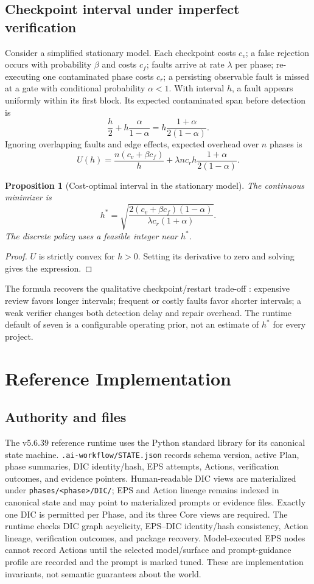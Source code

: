 \documentclass[11pt,a4paper]{article}
\newtheorem{proposition}[definition]{Proposition}
\begin{document}
\subsection{Checkpoint interval under imperfect verification}
Consider a simplified stationary model. Each checkpoint costs $c_v$; a false rejection occurs with probability $\beta$ and costs $c_f$; faults arrive at rate $\lambda$ per phase; re-executing one contaminated phase costs $c_r$; a persisting observable fault is missed at a gate with conditional probability $\alpha<1$. With interval $h$, a fault appears uniformly within its first block. Its expected contaminated span before detection is
\[
\frac h2+h\frac{\alpha}{1-\alpha}=h\frac{1+\alpha}{2(1-\alpha)}.
\]
Ignoring overlapping faults and edge effects, expected overhead over $n$ phases is
\[
U(h)=\frac{n(c_v+\beta c_f)}{h}+\lambda n c_r h\frac{1+\alpha}{2(1-\alpha)}.
\]
\begin{proposition}[Cost-optimal interval in the stationary model]
\label{prop:hstar}
The continuous minimizer is
\[
h^*=\sqrt{\frac{2(c_v+\beta c_f)(1-\alpha)}{\lambda c_r(1+\alpha)}}.
\]
The discrete policy uses a feasible integer near $h^*$.
\end{proposition}
\begin{proof}
$U$ is strictly convex for $h>0$. Setting its derivative to zero and solving gives the expression.
\end{proof}
The formula recovers the qualitative checkpoint/restart trade-off \cite{young1974first,daly2006higher}: expensive review favors longer intervals; frequent or costly faults favor shorter intervals; a weak verifier changes both detection delay and repair overhead. The runtime default of seven is a configurable operating prior, not an estimate of $h^*$ for every project.


\section{Reference Implementation}
\subsection{Authority and files}
The v5.6.39 reference runtime uses the Python standard library for its canonical state machine. \texttt{.ai-workflow/STATE.json} records schema version, active Plan, phase summaries, DIC identity/hash, EPS attempts, Actions, verification outcomes, and evidence pointers. Human-readable DIC views are materialized under \texttt{phases/<phase>/DIC/}; EPS and Action lineage remains indexed in canonical state and may point to materialized prompts or evidence files. Exactly one DIC is permitted per Phase, and its three Core views are required. The runtime checks DIC graph acyclicity, EPS--DIC identity/hash consistency, Action lineage, verification outcomes, and package recovery. Model-executed EPS nodes cannot record Actions until the selected model/surface and prompt-guidance profile are recorded and the prompt is marked tuned. These are implementation invariants, not semantic guarantees about the world.
\end{document}

